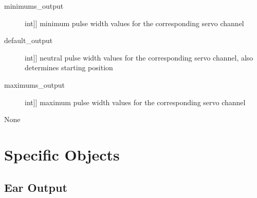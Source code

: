 \documentclass[letterpaper,10pt,english]{sphinxmanual}
\begin{document}
\begin{fulllineitems}
\begin{fulllineitems}
\sphinxAtStartPar
{}
\begin{description}
\item[{minimums\_output}] \leavevmode{[}{[}int{]}{]}
\sphinxAtStartPar
minimum pulse width values for the corresponding servo channel

\item[{default\_output}] \leavevmode{[}{[}int{]}{]}
\sphinxAtStartPar
neutral pulse width values for the corresponding servo channel, also determines starting position

\item[{maximums\_output}] \leavevmode{[}{[}int{]}{]}
\sphinxAtStartPar
maximum pulse width values for the corresponding servo channel

\end{description}

\sphinxAtStartPar
{}

\sphinxAtStartPar
None

\end{fulllineitems}


\end{fulllineitems}



\section{Specific Objects}
\label{\detokenize{specific:specific-objects}}\label{\detokenize{specific::doc}}

\subsection{Ear Output}
\label{\detokenize{specific:module-EarOutput}}\label{\detokenize{specific:ear-output}}
\end{document}
